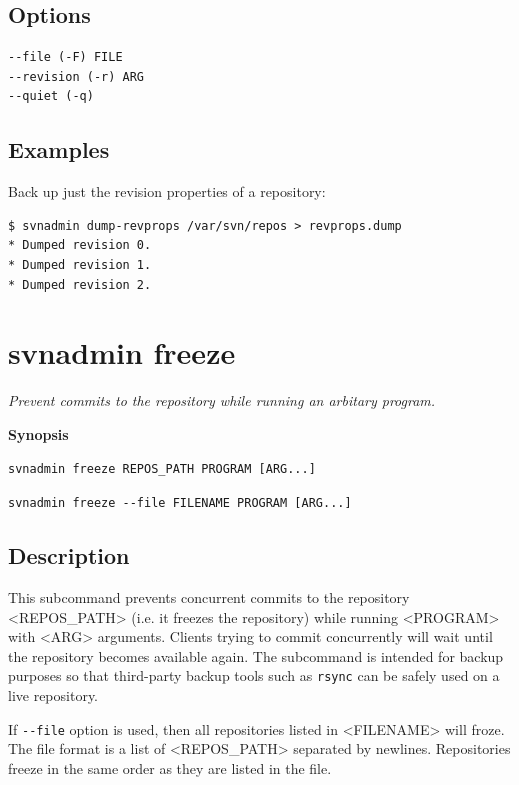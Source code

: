 \subsection{Options}

\begin{verbatim}
--file (-F) FILE
--revision (-r) ARG
--quiet (-q)
\end{verbatim}

\subsection{Examples}

Back up just the revision properties of a repository:

\begin{verbatim}
$ svnadmin dump-revprops /var/svn/repos > revprops.dump
* Dumped revision 0.
* Dumped revision 1.
* Dumped revision 2.
\end{verbatim}

\section{svnadmin freeze}\label{svn.ref.svnadmin.c.freeze}

\emph{Prevent commits to the repository while running an arbitary
program.}

\textbf{Synopsis}

\texttt{svnadmin\ freeze\ REPOS\_PATH\ PROGRAM\ {[}ARG...{]}}

\texttt{svnadmin\ freeze\ -\/-file\ FILENAME\ PROGRAM\ {[}ARG...{]}}

\subsection{Description}

This subcommand prevents concurrent commits to the repository
\textless REPOS\_PATH\textgreater{} (i.e. it freezes the repository)
while running \textless PROGRAM\textgreater{} with
\textless ARG\textgreater{} arguments. Clients trying to commit
concurrently will wait until the repository becomes available again. The
subcommand is intended for backup purposes so that third-party backup
tools such as \texttt{rsync} can be safely used on a live repository.

If \texttt{-\/-file} option is used, then all repositories listed in
\textless FILENAME\textgreater{} will froze. The file format is a list
of \textless REPOS\_PATH\textgreater{} separated by newlines.
Repositories freeze in the same order as they are listed in the file.

